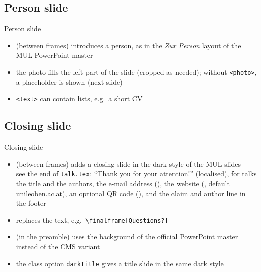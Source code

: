 \subsection{Person slide}
\begin{frame}{Person slide}
	\begin{itemize}[<1->]
		\item {} (between frames) introduces a person, as in the \emph{Zur Person} layout of the MUL PowerPoint master
		\item the photo fills the left part of the slide (cropped as needed); without \texttt{<photo>}, a placeholder is shown (next slide)
		\item \texttt{<text>} can contain lists, e.g.\ a short CV
	\end{itemize}
\end{frame}
%
%
\subsection{Closing slide}
\begin{frame}{Closing slide}
	\begin{itemize}[<1->]
		\item {} (between frames) adds a closing slide in the dark style of the MUL slides -- see the end of \texttt{talk.tex}: ``Thank you for your attention!'' (localised), for talks the title and the authors, the e-mail address (), the website (, default unileoben.ac.at), an optional QR code (), and the claim and author line in the footer
		\item {} replaces the text, e.g.\ \texttt{\textbackslash finalframe[Questions?]}
		\item {} (in the preamble) uses the background of the official PowerPoint master instead of the CMS variant
		\item the class option \texttt{darkTitle} gives a title slide in the same dark style
	\end{itemize}
\end{frame}
